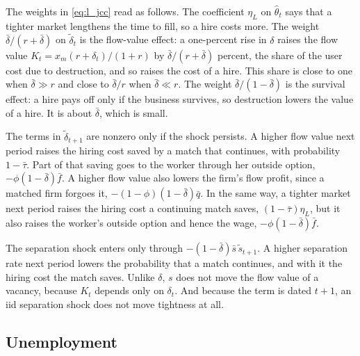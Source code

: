 \documentclass[authoryear, review, 12pt]{elsarticle}
\begin{document}
The weights in \eqref{eq:l_jcc} read as follows. The coefficient $\eta_L$ on $\hat\theta_t$
says that a tighter market lengthens the time to fill, so a hire costs more. The weight
$\bar\delta/(r+\bar\delta)$ on $\tilde\delta_t$ is the flow-value effect: a one-percent rise
in $\delta$ raises the flow value $K_t=x_m(r+\delta_t)/(1+r)$ by $\bar\delta/(r+\bar\delta)$
percent, the share of the user cost due to destruction, and so raises the cost of a hire.
This share is close to one when $\bar\delta\gg r$ and close to $\bar\delta/r$ when
$\bar\delta\ll r$. The weight $\bar\delta/(1-\bar\delta)$ is the survival effect: a hire pays
off only if the business survives, so destruction lowers the value of a hire. It is about
$\bar\delta$, which is small.

The terms in $\tilde\delta_{t+1}$ are nonzero only if the shock persists. A higher flow
value next period raises the hiring cost saved by a match that continues, with probability
$1-\bar\tau$. Part of that saving goes to the worker through her outside option,
$-\phi(1-\bar\delta)\bar f$. A higher flow value also lowers the firm's flow profit, since a
matched firm forgoes it, $-(1-\phi)(1-\bar\delta)\bar q$. In the same way, a tighter market
next period raises the hiring cost a continuing match saves, $(1-\bar\tau)\eta_L$, but it
also raises the worker's outside option and hence the wage, $-\phi(1-\bar\delta)\bar f$.

The separation shock enters only through $-(1-\bar\delta)\bar s\,\tilde s_{t+1}$. A higher
separation rate next period lowers the probability that a match continues, and with it the
hiring cost the match saves. Unlike $\delta$, $s$ does not move the flow value of a vacancy,
because $K_t$ depends only on $\delta_t$. And because the term is dated $t+1$, an iid
separation shock does not move tightness at all.

\subsection{Unemployment}
\end{document}
